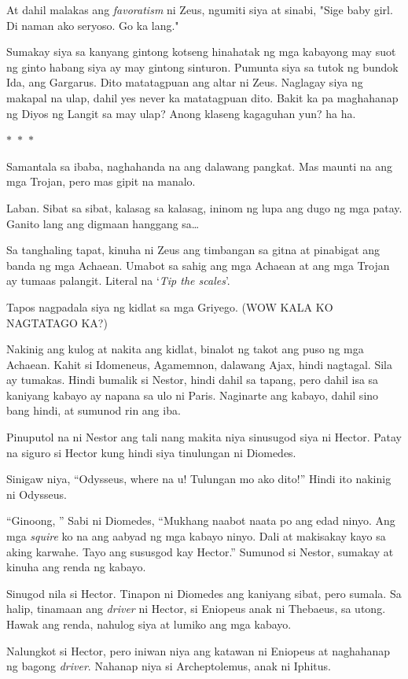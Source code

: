 \documentclass[12pt,letterpaper]{report}
\newcommand{\seperate}{\begin{center}$\ast$~$\ast$~$\ast$\end{center}}
\begin{document}
At dahil malakas ang \textit{favoratism} ni Zeus, ngumiti siya at sinabi, "Sige baby girl. Di naman ako seryoso. Go ka lang."

Sumakay siya sa kanyang gintong kotseng hinahatak ng mga kabayong may suot ng ginto habang siya ay may gintong sinturon. Pumunta siya sa tutok ng bundok Ida, ang Gargarus. Dito matatagpuan ang altar ni Zeus. Naglagay siya ng makapal na ulap, dahil yes never ka matatagpuan dito. Bakit ka pa maghahanap ng Diyos ng Langit sa may ulap? Anong klaseng kagaguhan yun? ha ha.

\seperate

Samantala sa ibaba, naghahanda na ang dalawang pangkat. Mas maunti na ang mga Trojan, pero mas gipit na manalo.

Laban. Sibat sa sibat, kalasag sa kalasag, ininom ng lupa ang dugo ng mga patay. Ganito lang ang digmaan hanggang sa\dots

Sa tanghaling tapat, kinuha ni Zeus ang timbangan sa gitna at pinabigat ang banda ng mga Achaean. Umabot sa sahig ang mga Achaean at ang mga Trojan ay tumaas palangit. Literal na `\textit{Tip the scales}'.

Tapos nagpadala siya ng kidlat sa mga Griyego. (WOW KALA KO NAGTATAGO KA?)

Nakinig ang kulog at nakita ang kidlat, binalot ng takot ang puso ng mga Achaean. Kahit si Idomeneus, Agamemnon, dalawang Ajax, hindi nagtagal. Sila ay tumakas. Hindi bumalik si Nestor, hindi dahil sa tapang, pero dahil isa sa kaniyang kabayo ay napana sa ulo ni Paris. Naginarte ang kabayo, dahil sino bang hindi, at sumunod rin ang iba.

Pinuputol na ni Nestor ang tali nang makita niya sinusugod siya ni Hector. Patay na siguro si Hector kung hindi siya tinulungan ni Diomedes.

Sinigaw niya, ``Odysseus, where na u! Tulungan mo ako dito!'' Hindi ito nakinig ni Odysseus. 

``Ginoong, '' Sabi ni Diomedes, ``Mukhang naabot naata po ang edad ninyo. Ang mga \textit{squire} ko na ang aabyad ng mga kabayo ninyo. Dali at makisakay kayo sa aking karwahe. Tayo ang sususgod kay Hector.'' Sumunod si Nestor, sumakay at kinuha ang renda ng kabayo.

Sinugod nila si Hector. Tinapon ni Diomedes ang kaniyang sibat, pero sumala. Sa halip, tinamaan ang \textit{driver} ni Hector, si Eniopeus anak ni Thebaeus, sa utong. Hawak ang renda, nahulog siya at lumiko ang mga kabayo. 

Nalungkot si Hector, pero iniwan niya ang katawan ni Eniopeus at naghahanap ng bagong \textit{driver}. Nahanap niya si Archeptolemus, anak ni Iphitus.
\end{document}

